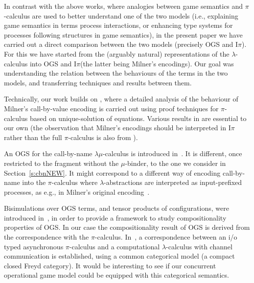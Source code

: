 \documentclass[11pt,a4paper]{amsart}
\theoremstyle{plain}
\theoremstyle{definition}
\theoremstyle{defC}
\theoremstyle{thmC}
\theoremstyle{plain}
\numberwithin{equation}{section}
\newif\iflong\longtrue
\newcommand{\fwdsymb}{\triangleright}
\newcommand{\fwd}[2]{#1\fwdsymb #2}
\newcommand{\Intp}{\mbox{I$\pi$}\xspace}   %
\newcommand{\piI}{\Intp}   %
\theoremstyle{plain}
\theoremstyle{definition}
\begin{document}
In contrast with the above works,  where analogies between game semantics and
$\pi$-calculus are used to better understand one of the two models 
(i.e., explaining  game semantics in terms process interactions,  or enhancing type systems for
processes following structures in game semantics), 
in the  present paper we have carried out a direct comparison between 
the two models (precisely OGS and \piI). 
For this we have started from
 the (arguably natural)  representations of the $\lambda$-calculus 
into OGS and \piI  (the latter being Milner's encodings).
Our goal was
understanding the  relation between  the behaviours of the terms in the
two models, and   transferring techniques and results between them.

Technically, our work  builds on
\cite{DurierHS18,Durier20}, where a  detailed analysis of the behaviour of Milner's
call-by-value encoding is carried out using proof techniques for
$\pi$-calculus based on unique-solution of equations.
Various results in \cite{DurierHS18,Durier20} are essential to our own
 (the observation that Milner's
encodings should be interpreted in \piI rather than the full $\pi$-calculus is also from
\cite{DurierHS18,Durier20}).

An OGS %
for the call-by-name $\lambda\mu$-calculus is introduced
in~\cite{DBLP:conf/fossacs/Laird20}. It 
 is different, once restricted to the fragment without the $\mu$-binder, to the one we
 consider in Section~\ref{s:cbnNEW}.  It might correspond  
 to a different way of encoding  call-by-name into the $\pi$-calculus
where $\lambda$-abstractions are interpreted as input-prefixed processes, as e.g., in 
 Milner's original encoding~\cite{Mil92s}.





Bisimulations over  OGS terms, and tensor products of configurations,
were introduced in~\cite{10.1145/2603088.2603150},
in order to provide a framework to study compositionality properties of OGS.
In our case the compositionality result of OGS is derived from the correspondence with the
$\pi$-calculus.
In~\cite{sakayori2019categorical}, a correspondence between an i/o typed asynchronous $\pi$-calculus 
and a computational $\lambda$-calculus with channel communication is established, 
using a common categorical model (a compact closed Freyd category).
It would be interesting to see if our concurrent operational game model could be equipped with this categorical semantics.
\end{document}
